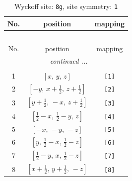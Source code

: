 \documentclass[fleqn,8pt]{jsarticle}
\begin{document}
\renewcommand{\arraystretch}{1.2}
\begin{longtable}{ccc}
\caption{Wyckoff site: {\tt 8g}, site symmetry: {\tt 1}}
 \\
 \hline \hline
No. & position & mapping \\ \hline \endfirsthead

\multicolumn{2}{l}{\tablename\ \thetable{}} \\
 \hline \hline
No. & position & mapping \\ \hline \endhead

 \hline \hline
\multicolumn{2}{r}{\footnotesize\it continued ...} \\ \endfoot

 \hline \hline
\multicolumn{2}{r}{} \\ \endlastfoot

1 & $\left[ x,\, y,\, z \right]$ & {\tt [1]} \\ \hline
2 & $\left[ - y,\, x + \frac{1}{2},\, z + \frac{1}{2} \right]$ & {\tt [2]} \\ \hline
3 & $\left[ y + \frac{1}{2},\, - x,\, z + \frac{1}{2} \right]$ & {\tt [3]} \\ \hline
4 & $\left[ \frac{1}{2} - x,\, \frac{1}{2} - y,\, z \right]$ & {\tt [4]} \\ \hline
5 & $\left[ - x,\, - y,\, - z \right]$ & {\tt [5]} \\ \hline
6 & $\left[ y,\, \frac{1}{2} - x,\, \frac{1}{2} - z \right]$ & {\tt [6]} \\ \hline
7 & $\left[ \frac{1}{2} - y,\, x,\, \frac{1}{2} - z \right]$ & {\tt [7]} \\ \hline
8 & $\left[ x + \frac{1}{2},\, y + \frac{1}{2},\, - z \right]$ & {\tt [8]} \\
\end{longtable}
\end{document}
